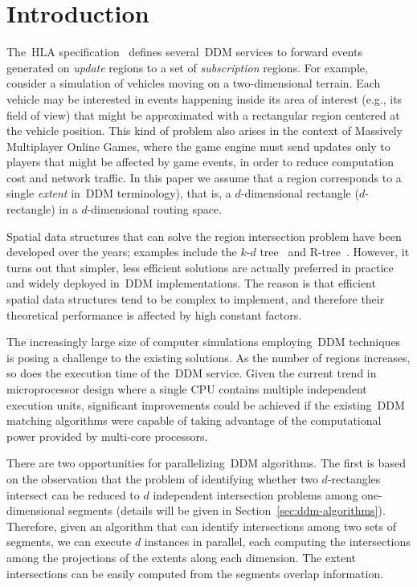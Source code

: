 \documentclass[10pt, conference, compsocconf]{IEEEtran}
\begin{document}
\section{Introduction}\label{sec:introduction}

The~\ac{HLA} specification~\cite{HLA} defines several~\ac{DDM}
services to forward events generated on \emph{update} regions to a set
of \emph{subscription} regions. For example, consider a simulation of
vehicles moving on a two-dimensional terrain. Each vehicle may be
interested in events happening inside its area of interest (e.g., its
field of view) that might be approximated with a rectangular region
centered at the vehicle position. This kind of problem also arises in
the context of Massively Multiplayer Online Games, where the game
engine must send updates only to players that might be affected by
game events, in order to reduce computation cost and network
traffic. In this paper we assume that a region corresponds to a single
\emph{extent} in~\ac{DDM} terminology), that is, a $d$-dimensional
rectangle ($d$-rectangle) in a $d$-dimensional routing space.

Spatial data structures that can solve the region intersection problem
have been developed over the years; examples include the $k$-$d$
tree~\cite{Rosenberg1985} and R-tree~\cite{Guttman1984}. However, it
turns out that simpler, less efficient solutions are actually
preferred in practice and widely deployed in~\ac{DDM}
implementations. The reason is that efficient spatial data structures
tend to be complex to implement, and therefore their theoretical
performance is affected by high constant factors.

The increasingly large size of computer simulations employing~\ac{DDM}
techniques is posing a challenge to the existing solutions. As the
number of regions increases, so does the execution time of
the~\ac{DDM} service. Given the current trend in microprocessor design
where a single CPU contains multiple independent execution units,
significant improvements could be achieved if the existing~\ac{DDM}
matching algorithms were capable of taking advantage of the
computational power provided by multi-core processors.

There are two opportunities for parallelizing~\ac{DDM} algorithms.
The first is based on the observation that the problem of identifying
whether two $d$-rectangles intersect can be reduced to $d$ independent
intersection problems among one-dimensional segments (details will be
given in Section~\ref{sec:ddm-algorithms}). Therefore, given an
algorithm that can identify intersections among two sets of segments,
we can execute $d$ instances in parallel, each computing the
intersections among the projections of the extents along each
dimension. The extent intersections can be easily computed from the
segments overlap information.
\end{document}
